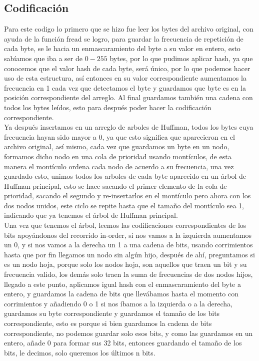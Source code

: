 \documentclass[12 pt]{report}
\begin{document}
\subsection*{Codificación}
Para este codigo lo primero que se hizo fue leer los bytes del archivo original, con ayuda de la función fread se logro, para guardar la frecuencia de repetición de cada byte, se le hacia un enmascaramiento del byte a su valor en entero, esto sabíamos que iba a ser de $0-255$ bytes, por lo que pudimos aplicar hash, ya que conocemos que el valor hash de cada byte, será único, por lo que podemos hacer uso de esta estructura, así entonces en su valor correspondiente aumentamos la frecuencia en 1 cada vez que detectamos el byte y guardamos que byte es en la posición correspondiente del arreglo. Al final guardamos también una cadena con todos los bytes leídos, esto para después poder hacer la codificación correspondiente.\\
Ya después insertamos en un arreglo de arboles de Huffman, todos los bytes cuya frecuencia hayan sido mayor a 0, ya que esto significa que aparecieron en el archivo original, así mismo, cada vez que guardamos un byte en un nodo, formamos dicho nodo en una cola de prioridad usando montículos, de esta manera el montículo ordena cada nodo de acuerdo a su frecuencia, una vez guardado esto, unimos todos los arboles de cada byte aparecido en un árbol de Huffman principal, esto se hace sacando el primer elemento de la cola de prioridad, sacando el segundo y re-insertarlos en el montículo pero ahora con los dos nodos unidos, este ciclo se repite hasta que el tamaño del montículo sea 1, indicando que ya tenemos el árbol de Huffman principal.\\
Una vez que tenemos el árbol, leemos las codificaciones correspondientes de los bits apoyándonos del recorrido in-order, si nos vamos a la izquierda aumentamos un 0, y si nos vamos a la derecha un 1 a una cadena de bits, usando corrimientos hasta que por fin llegamos un nodo sin algún hijo, después de ahí, preguntamos si es un nodo hoja, porque solo los nodos hoja, son aquellos que traen un bit y su frecuencia valido, los demás solo traen la suma de frecuencias de dos nodos hijos, llegado a este punto, aplicamos igual hash con el enmascaramiento del byte a entero, y guardamos la cadena de bits que llevábamos hasta el momento con corrimientos y añadiendo 0 o 1 si nos íbamos a la izquierda o a la derecha, guardamos su byte correspondiente y guardamos el tamaño de los bits correspondiente, esto es porque si bien guardamos la cadena de bits correspondiente, no podemos guardar solo esos bits, y como las guardamos en un entero, añade 0 para formar sus 32 bits, entonces guardando el tamaño de los bits, le decimos, solo queremos los últimos n bits.\\
\end{document}
